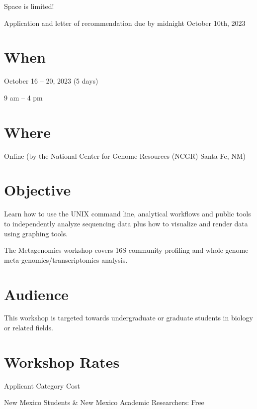 \documentclass[
]{book}
\begin{document}
Space is limited!

Application and letter of recommendation due by midnight October 10th, 2023

\hypertarget{when-3}{%
\section*{When}\label{when-3}}

October 16 -- 20, 2023 (5 days)

9 am -- 4 pm

\hypertarget{where-2}{%
\section*{Where}\label{where-2}}

Online (by the National Center for Genome Resources (NCGR) Santa Fe, NM)

\hypertarget{objective-2}{%
\section*{Objective}\label{objective-2}}

Learn how to use the UNIX command line, analytical workflows and public tools to independently analyze sequencing data plus how to visualize and render data using graphing tools.

The Metagenomics workshop covers 16S community profiling and whole genome meta-genomics/transcriptomics analysis.

\hypertarget{audience-2}{%
\section*{Audience}\label{audience-2}}

This workshop is targeted towards undergraduate or graduate students in biology or related fields.

\hypertarget{workshop-rates-2}{%
\section*{Workshop Rates}\label{workshop-rates-2}}

Applicant Category Cost

New Mexico Students \& New Mexico Academic Researchers:
Free
\end{document}
